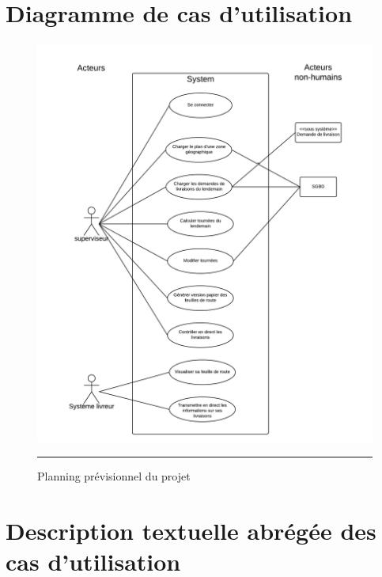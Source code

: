 \section{Diagramme de cas d'utilisation}
\begin{figure}[htbp]
	\centering
		\includegraphics[width=\textwidth,height=\textheight,keepaspectratio]{Figures/cu}
		\rule{35em}{0.5pt}
	\caption[Planning prévisionnel]{Planning prévisionnel du projet}
\end{figure}
\section{Description textuelle abrégée des cas d'utilisation}
